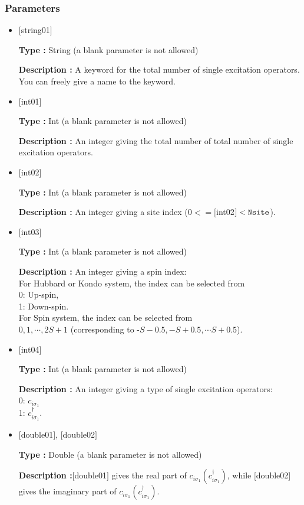 \subsubsection{Parameters}
 \begin{itemize}

   \item  $[$string01$]$
   
    {\bf Type :} String (a blank parameter is not allowed)

   {\bf Description :} A keyword for the total number of single excitation operators. You can freely give a name to the keyword.

   \item  $[$int01$]$
   
    {\bf Type :} Int (a blank parameter is not allowed)

   {\bf Description :} An integer giving the total number of total number of single excitation operators.

  \item  $[$int02$]$

 {\bf Type :} Int (a blank parameter is not allowed)

 {\bf Description :} An integer giving a site index ($0<= [$int02$]<\verb|Nsite|$).
 
  \item  $[$int03$]$
  
 {\bf Type :} Int (a blank parameter is not allowed)

{\bf Description :} 
An integer giving a spin index:\\
For Hubbard or Kondo system, the index can be selected from\\
0: Up-spin,\\
1: Down-spin.\\
For Spin system, the index can be selected from\\
$0, 1, \cdots, 2S+1$ (corresponding to -$S-0.5, -S+0.5, \cdots S+0.5$).

\item  $[$int04$]$

 {\bf Type :} Int (a blank parameter is not allowed)

{\bf Description :} 
An integer giving a type of single excitation operators:\\
0: $ c_{i\sigma_1}$\\
1: $ c_{i\sigma_1}^{\dagger}$.\\

\item  $[$double01$]$, $[$double02$]$

 {\bf Type :} Double (a blank parameter is not allowed)

{\bf Description :}$[$double01$]$ gives the real part of $c_{i\sigma_1} (c_{i\sigma_1} ^{\dag})$, while $[$double02$]$ gives the imaginary part of $c_{i\sigma_1} (c_{i\sigma_1} ^{\dag})$.

\end{itemize}

